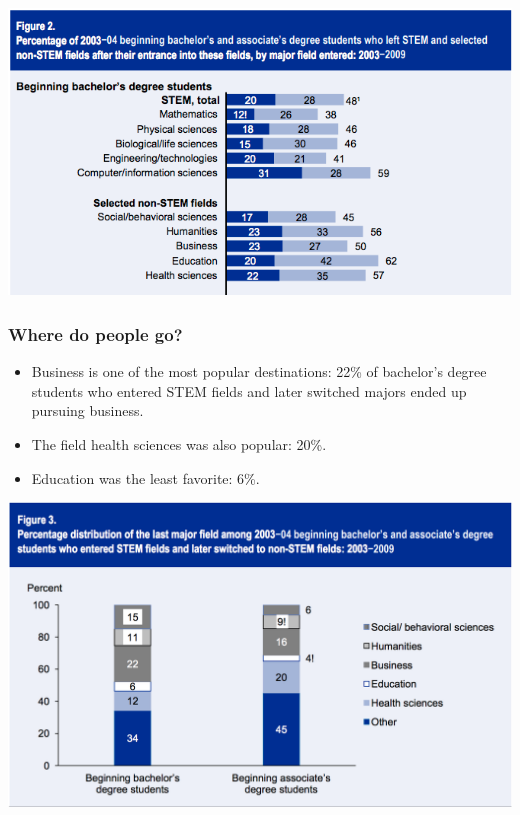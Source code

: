 \documentclass{beamer}
\begin{document}
\begin{frame}
  \includegraphics[scale = 0.5]{pic2.png}
\end{frame}

\begin{frame}
  \frametitle{Where do people go?}
  \begin{itemize}
  \item Business is one of the most popular destinations: 22\% of bachelor's degree students who entered STEM fields and later switched majors ended up pursuing business.
  \item The field health sciences was also popular: 20\%.
  \item Education was the least favorite: 6\%.
  \end{itemize}
\end{frame}

\begin{frame}
  \includegraphics[scale = 0.25]{pic3.png}
\end{frame}
\end{document}
